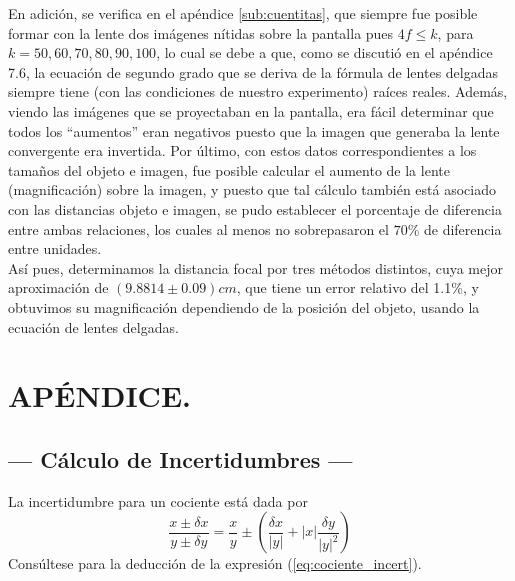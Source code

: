 \documentclass[10pt,a4paper]{article}
\begin{document}
En adición, se verifica en el apéndice \ref{sub:cuentitas}, que siempre fue posible formar con la lente dos imágenes nítidas sobre la pantalla pues $4f \leqslant k$, para $k=50,60,70,80,90,100$, lo cual se debe a que, como se discutió en el apéndice 7.6, la ecuación de segundo grado que se deriva de la fórmula de lentes delgadas siempre tiene (con las condiciones de nuestro experimento) raíces reales. Además, viendo las imágenes que se proyectaban en la pantalla, era fácil determinar que todos los “aumentos” eran negativos puesto que la imagen que generaba la lente convergente era invertida. Por último, con estos datos correspondientes a los tamaños del objeto e imagen, fue posible calcular el aumento de la lente (magnificación) sobre la imagen, y puesto que tal cálculo también está asociado con las distancias objeto e imagen, se pudo establecer el porcentaje de diferencia entre ambas relaciones, los cuales al menos no sobrepasaron el $70$\textsc{\%} de diferencia entre unidades. \\[2mm]
Así pues, determinamos la distancia focal por tres métodos distintos, cuya mejor aproximación de $(9.8814 \pm 0.09)cm$, que tiene un error relativo del 1.1\textsc{\%}, y obtuvimos su magnificación dependiendo de la posición del objeto, usando la ecuación de lentes delgadas.




\section{APÉNDICE.} %

\subsection{--- Cálculo de Incertidumbres ---} %
\label{sub:incertidumbres}
La incertidumbre para un cociente está dada por
\begin{equation}
	\dfrac{x\pm\delta x}{y\pm\delta y}=\dfrac{x}{y}\pm\left(\dfrac{\delta x}{|y|}+|x|\dfrac{\delta y}{|y|^2}\right)
	\label{eq:cociente_incert}
\end{equation}
Consúltese  para la deducción de la expresión (\ref{eq:cociente_incert}).
\end{document}
